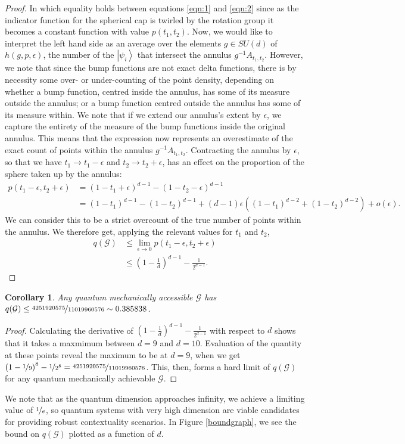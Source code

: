 \documentclass{amsart}
\newtheorem{cor}{Corollary}
\theoremstyle{definition}
\newcommand{\ket}[1]{{\left\vert{#1}\right\rangle}}
\begin{document}
\begin{proof}
In which equality holds between equations \ref{eqn:1} and \ref{eqn:2} since as the indicator function for the spherical cap is twirled by the rotation group it becomes a constant function with value $p(t_1,t_2)$. Now, we would like to interpret the left hand side as an average over the elements $g\in SU(d)$ of $h(g,p,\epsilon)$, the number of the $\ket{\psi_i}$ that intersect the annulus $g^{-1}A_{t_1,t_2}$. However, we note that since the bump functions are not exact delta functions, there is by necessity some over- or under-counting of the point density, depending on whether a bump function, centred inside the annulus, has some of its measure outside the annulus; or a bump function centred outside the annulus has some of its measure within. We note that if we extend our annulus's extent by $\epsilon$, we capture the entirety of the measure of the bump functions inside the original annulus. This means that the expression now represents an overestimate of the exact count of points within the annulus $g^{-1}A_{t_1,t_2}$. Contracting the annulus by $\epsilon$, so that we have $t_1\rightarrow t_1-\epsilon$ and $t_2\rightarrow t_2+\epsilon$,  has an effect on the proportion of the sphere taken up by the annulus:
\begin{align}
p(t_1-\epsilon,t_2+\epsilon)&=\left(1-t_1+\epsilon\right)^{d-1}-\left(1-t_2-\epsilon\right)^{d-1}\\
&=(1-t_1)^{d-1}-(1-t_2)^{d-1}+(d-1)\epsilon\left((1-t_1)^{d-2}+(1-t_2)^{d-2}\right)+o(\epsilon).
\end{align}
We can consider this to be a strict overcount of the true number of points within the annulus. We therefore get, applying the relevant values for $t_1$ and $t_2$,
\begin{align}
q(\mathcal{G})&\leq \lim_{\epsilon\rightarrow0}p(t_1-\epsilon,t_2+\epsilon) \\
&\leq \left(1-\frac1d\right)^{d-1}-\frac{1}{2^{d-1}}.
\end{align}

\end{proof} 
\begin{cor}
Any quantum mechanically accessible $\mathcal{G}$ has  $q(\mathcal{G})\leq\nicefrac{4251920575}{11019960576}\sim0.385838$.
\end{cor}
\begin{proof}
Calculating the derivative of $ \left(1-\frac1d\right)^{d-1}-\frac{1}{2^{d-1}}$ with respect to $d$ shows that it takes a maxmimum between $d=9$ and $d=10$. Evaluation of the quantity at these points reveal the maximum to be at $d=9$, when we get $\left(1-\nicefrac19\right)^{8}-\nicefrac{1}{2^{8}}=\nicefrac{4251920575}{11019960576}$. This, then, forms a hard limit of $q(\mathcal{G})$ for any quantum mechanically achievable $\mathcal{G}$.
\end{proof}
We note that as the quantum dimension approaches infinity, we achieve a limiting value of $\nicefrac1e$, so quantum systems with very high dimension are viable candidates for providing robust contextuality scenarios. In Figure \ref{boundgraph}, we see the bound on $q(\mathcal{G})$ plotted as a function of $d$.
\end{document}

